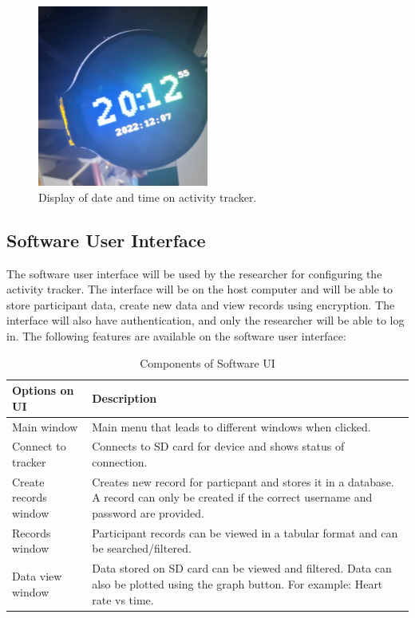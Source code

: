 \documentclass[12pt, titlepage]{article}
\begin{document}
\begin{figure}[H]
	\begin{center}
		 \includegraphics[width=0.5\textwidth]{DisplayTime}
		\caption{Display of date and time on activity tracker.}
		\label{DisplayTime} 
	\end{center}
\end{figure}
\newpage

\subsection{Software User Interface}

The software user interface will be used by the researcher for configuring the activity tracker. The interface will be on the host computer and will be able to store participant data, create new data and view records using encryption. The interface will also have authentication, and only the researcher will be able to log in. The following features are available on the software user interface:

\begin{table}[H]
	\begin{tabular}{|p{5cm}|p{10cm}|}
		 \hline
		 \textbf{Options on UI} & \textbf{Description}\\
		 \hline
		Main window & Main menu that leads to different windows when clicked.\\
		\hline
		 Connect to tracker  & Connects to SD card for device and shows status of connection.\\
		 \hline
		   Create records window & Creates new record for particpant and stores it in a database. A record can only be created if the correct username and password are provided. \\
		\hline 
		Records window & Participant records can be viewed in a tabular format and can be searched/filtered.\\
		\hline
		Data view window & Data stored on SD card can be viewed and filtered. Data can also be plotted using the graph button. For example: Heart rate vs time.\\
		\hline
	\end{tabular}
\caption{\label{Software User Interface}Components of Software UI}  
\end{table}
\end{document}
